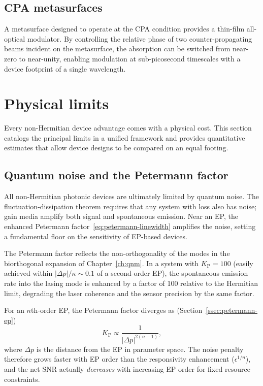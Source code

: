 \subsection{CPA metasurfaces}
\label{ssec:cpa-metasurface}

A metasurface designed to operate at the CPA condition provides a
thin-film all-optical modulator. By controlling the relative phase
of two counter-propagating beams incident on the metasurface, the
absorption can be switched from near-zero to near-unity, enabling
modulation at sub-picosecond timescales with a device footprint of
a single wavelength.


\section{Physical limits}
\label{sec:physical-limits}

Every non-Hermitian device advantage comes with a physical cost. This
section catalogs the principal limits in a unified framework and
provides quantitative estimates that allow device designs to be compared
on an equal footing.

\subsection{Quantum noise and the Petermann factor}
\label{ssec:quantum-noise}

All non-Hermitian photonic devices are ultimately limited by quantum
noise. The fluctuation-dissipation theorem requires that any system with
loss also has noise; gain media amplify both signal and spontaneous
emission. Near an EP, the enhanced Petermann
factor~\eqref{eq:petermann-linewidth} amplifies the noise, setting a
fundamental floor on the sensitivity of EP-based devices.

The Petermann factor reflects the non-orthogonality of the modes in the
biorthogonal expansion of Chapter~\ref{ch:qnm}. In a system with
$K_{\mathrm{P}} = 100$ (easily achieved within
$|\Delta p|/\kappa \sim 0.1$ of a second-order EP), the spontaneous
emission rate into the lasing mode is enhanced by a factor of 100
relative to the Hermitian limit, degrading the laser coherence and the
sensor precision by the same factor.

For an $n$th-order EP, the Petermann factor diverges as
(Section~\ref{ssec:petermann-ep})
\begin{equation}
 K_{\mathrm{P}} \propto \frac{1}{|\Delta p|^{2(n-1)}},
 \label{eq:petermann-scaling-device}
\end{equation}
where $\Delta p$ is the distance from the EP in parameter space. The
noise penalty therefore grows faster with EP order than the responsivity
enhancement ($\epsilon^{1/n}$), and the net SNR actually \emph{decreases}
with increasing EP order for fixed resource constraints.

